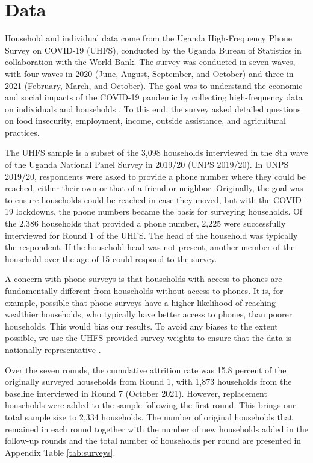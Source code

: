 \documentclass{wber}
\begin{document}
\section{Data}\label{data}

Household and individual data come from the Uganda High-Frequency
Phone Survey on COVID-19 (UHFS), conducted by the Uganda Bureau of
Statistics in collaboration with the World Bank. The survey was
conducted in seven waves, with four waves in 2020 (June, August,
September, and October) and three in 2021 (February, March, and
October). The goal was to understand the economic and social impacts of
the COVID-19 pandemic by collecting high-frequency data on individuals
and households \citep{Uganda-Bureau-of-Statistics2022}. To this end, the
survey asked detailed questions on food insecurity, employment, income,
outside assistance, and agricultural practices.

The UHFS sample is a subset of the 3,098 households interviewed in the
8th wave of the Uganda National Panel Survey in 2019/20 (UNPS 2019/20).
In UNPS 2019/20, respondents were asked to provide a phone number where
they could be reached, either their own or that of a friend or neighbor.
Originally, the goal was to ensure households could be reached in case
they moved, but with the COVID-19 lockdowns, the phone numbers became
the basis for surveying households. Of the 2,386 households that
provided a phone number, 2,225 were successfully interviewed for Round 1
of the UHFS. The head of the household was typically the respondent. If
the household head was not present, another member of the household over
the age of 15 could respond to the survey.

A concern with phone surveys is that households with access to phones
are fundamentally different from households without access to phones. It
is, for example, possible that phone surveys have a higher likelihood of
reaching wealthier households, who typically have better access to
phones, than poorer households. This would bias our results. To avoid
any biases to the extent possible, we use the UHFS-provided survey
weights to ensure that the data is nationally representative
\citep{Uganda-Bureau-of-Statistics2022}.

Over the seven rounds, the cumulative attrition rate was 15.8 percent of
the originally surveyed households from Round 1, with 1,873 households
from the baseline interviewed in Round 7 (October 2021). However,
replacement households were added to the sample following the first
round. This brings our total sample size to 2,334 households. The number
of original households that remained in each round together with the
number of new households added in the follow-up rounds and the total
number of households per round are presented in Appendix Table
\ref{tab:surveys}.
\end{document}
